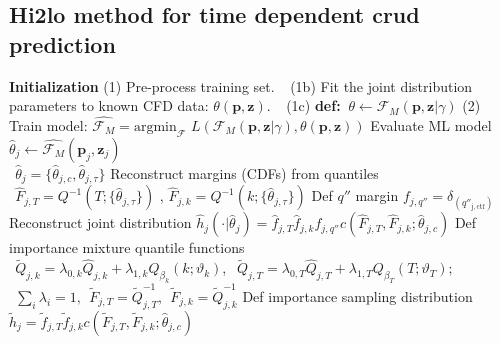 \documentclass[t, pdftex]{beamer}
\begin{document}
\subsection*{Hi2lo method for time dependent crud prediction}
\begin{frame}
\vspace{-18.5pt}
    \begin{algorithm}[H]
        \tiny      
        \begin{algorithmic}[1]      
            \STATE \textbf{Initialization}  
            \STATE (1) Pre-process training set.  
            \STATE $\ \ $   (1b) Fit the joint distribution parameters to known CFD data: $\theta(\mathbf p, \mathbf z)$.  
            \STATE $\ \ $   (1c) \textbf{def:}  $\ \theta \leftarrow \mathcal F_M(\mathbf p, \mathbf z | \gamma)$
            \STATE (2) Train model:  $\hat{\mathcal F_M} =  \mathrm{argmin}_{\mathcal F}$
            $L(\mathcal{F}_M (\mathbf p, \mathbf z| \gamma), \theta(\mathbf p, \mathbf z)) $
            \STATE Evaluate ML model $\hat \theta_j \leftarrow \hat{\mathcal F_M}(\mathbf p_j, \mathbf z_j)$ \\
            $\ \ \hat \theta_j = \{\hat \theta_{j,c}, \hat \theta_{j,\tau} \}$
            \STATE Reconstruct margins (CDFs) from quantiles  \\
            $\ \ \hat F_{j,T}= Q^{-1}(T; \{\hat{\theta}_{j,\tau} \})$ , $\hat F_{j,k}= Q^{-1}(k; \{\hat{\theta}_{j,\tau} \})$
            \STATE Def $q''$ margin  $f_{j,q''} = \delta_{(q''_\mathrm{j,ctf})}$
            \STATE Reconstruct joint distribution $\hat h_j(\cdot |\hat \theta_j) = \hat f_{j,T} \hat f_{j,k} f_{j,q''} c(\hat F_{j,T}, \hat F_{j,k}; \hat \theta_{j,c})$ \;
            \ENDFOR
            \STATE Def importance  mixture quantile functions \\
            $\ \ \tilde Q_{j,k} = \lambda_{0,k} \hat Q_{j,k}  + \lambda_{1,k} Q_{\beta_k}(k; \vartheta_k)$, 
            $\ \ \tilde Q_{j,T} = \lambda_{0,T} \hat Q_{j,T}  + \lambda_{1,T} Q_{\beta_T}(T; \vartheta_T); $ \\
            $\ \ \sum_i \lambda_i = 1, \ \ \tilde F_{j,T} = \tilde Q^{-1}_{j,T},\ \  \tilde F_{j,k} = \tilde Q^{-1}_{j,k} $
            \STATE Def importance sampling distribution $\tilde h_j = \tilde f_{j,T} \tilde f_{j,k} c(\tilde F_{j,T}, \tilde F_{j,k}; \hat \theta_{j,c}) $

\end{algorithmic}
\end{algorithm}
\end{frame}
\end{document}
